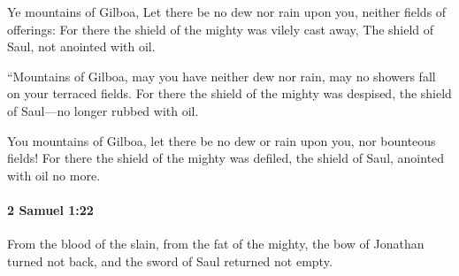 			\begin{versebox}
					\item[BHS] 
					\item[ASV] Ye mountains of Gilboa, Let there be no dew nor rain upon you, neither fields of offerings: For there the shield of the mighty was vilely cast away, The shield of Saul, not anointed with oil.
					\item[NIV] “Mountains of Gilboa, may you have neither dew nor rain, may no showers fall on your terraced fields. For there the shield of the mighty was despised, the shield of Saul—no longer rubbed with oil.
					\item[NRSV] You mountains of Gilboa, let there be no dew or rain upon you, nor bounteous fields! For there the shield of the mighty was defiled, the shield of Saul, anointed with oil no more.
			\end{versebox}

		\paragraph{2 Samuel 1:22} %
			\label{2SAMUEL-1-22}

			From the blood of the slain, from the fat of the mighty, the bow of Jonathan turned not back, and the sword of Saul returned not empty.

